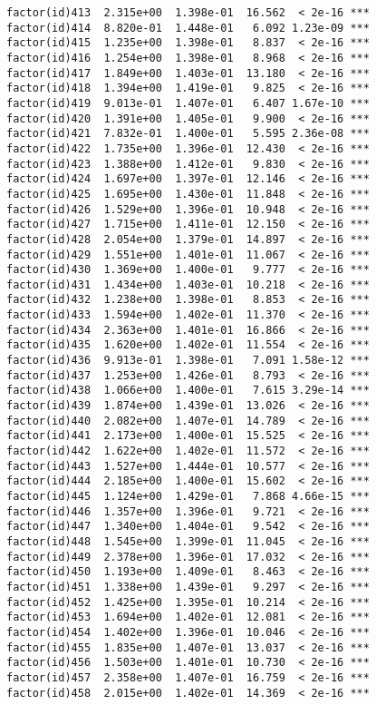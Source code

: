 \documentclass[]{article}
\begin{document}
\begin{verbatim}
factor(id)413  2.315e+00  1.398e-01  16.562  < 2e-16 ***
factor(id)414  8.820e-01  1.448e-01   6.092 1.23e-09 ***
factor(id)415  1.235e+00  1.398e-01   8.837  < 2e-16 ***
factor(id)416  1.254e+00  1.398e-01   8.968  < 2e-16 ***
factor(id)417  1.849e+00  1.403e-01  13.180  < 2e-16 ***
factor(id)418  1.394e+00  1.419e-01   9.825  < 2e-16 ***
factor(id)419  9.013e-01  1.407e-01   6.407 1.67e-10 ***
factor(id)420  1.391e+00  1.405e-01   9.900  < 2e-16 ***
factor(id)421  7.832e-01  1.400e-01   5.595 2.36e-08 ***
factor(id)422  1.735e+00  1.396e-01  12.430  < 2e-16 ***
factor(id)423  1.388e+00  1.412e-01   9.830  < 2e-16 ***
factor(id)424  1.697e+00  1.397e-01  12.146  < 2e-16 ***
factor(id)425  1.695e+00  1.430e-01  11.848  < 2e-16 ***
factor(id)426  1.529e+00  1.396e-01  10.948  < 2e-16 ***
factor(id)427  1.715e+00  1.411e-01  12.150  < 2e-16 ***
factor(id)428  2.054e+00  1.379e-01  14.897  < 2e-16 ***
factor(id)429  1.551e+00  1.401e-01  11.067  < 2e-16 ***
factor(id)430  1.369e+00  1.400e-01   9.777  < 2e-16 ***
factor(id)431  1.434e+00  1.403e-01  10.218  < 2e-16 ***
factor(id)432  1.238e+00  1.398e-01   8.853  < 2e-16 ***
factor(id)433  1.594e+00  1.402e-01  11.370  < 2e-16 ***
factor(id)434  2.363e+00  1.401e-01  16.866  < 2e-16 ***
factor(id)435  1.620e+00  1.402e-01  11.554  < 2e-16 ***
factor(id)436  9.913e-01  1.398e-01   7.091 1.58e-12 ***
factor(id)437  1.253e+00  1.426e-01   8.793  < 2e-16 ***
factor(id)438  1.066e+00  1.400e-01   7.615 3.29e-14 ***
factor(id)439  1.874e+00  1.439e-01  13.026  < 2e-16 ***
factor(id)440  2.082e+00  1.407e-01  14.789  < 2e-16 ***
factor(id)441  2.173e+00  1.400e-01  15.525  < 2e-16 ***
factor(id)442  1.622e+00  1.402e-01  11.572  < 2e-16 ***
factor(id)443  1.527e+00  1.444e-01  10.577  < 2e-16 ***
factor(id)444  2.185e+00  1.400e-01  15.602  < 2e-16 ***
factor(id)445  1.124e+00  1.429e-01   7.868 4.66e-15 ***
factor(id)446  1.357e+00  1.396e-01   9.721  < 2e-16 ***
factor(id)447  1.340e+00  1.404e-01   9.542  < 2e-16 ***
factor(id)448  1.545e+00  1.399e-01  11.045  < 2e-16 ***
factor(id)449  2.378e+00  1.396e-01  17.032  < 2e-16 ***
factor(id)450  1.193e+00  1.409e-01   8.463  < 2e-16 ***
factor(id)451  1.338e+00  1.439e-01   9.297  < 2e-16 ***
factor(id)452  1.425e+00  1.395e-01  10.214  < 2e-16 ***
factor(id)453  1.694e+00  1.402e-01  12.081  < 2e-16 ***
factor(id)454  1.402e+00  1.396e-01  10.046  < 2e-16 ***
factor(id)455  1.835e+00  1.407e-01  13.037  < 2e-16 ***
factor(id)456  1.503e+00  1.401e-01  10.730  < 2e-16 ***
factor(id)457  2.358e+00  1.407e-01  16.759  < 2e-16 ***
factor(id)458  2.015e+00  1.402e-01  14.369  < 2e-16 ***

\end{verbatim}
\end{document}
